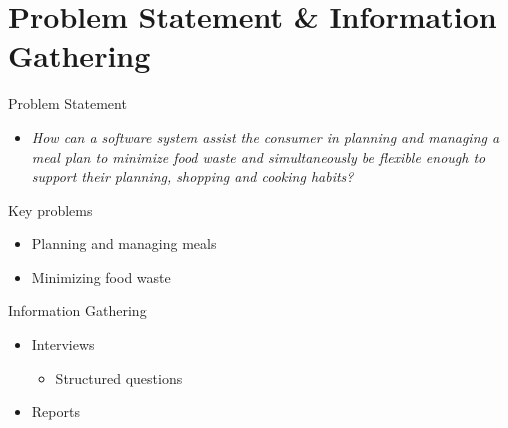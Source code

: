 \section{Problem Statement \& Information Gathering} 
\begin{frame}{Problem Statement}
    \begin{itemize}
        \item \textit{How can a software system assist the consumer in planning and managing a meal plan
        to minimize food waste and simultaneously be flexible enough to support their planning,
        shopping and cooking habits?}
    \end{itemize}
    	Key problems
        \begin{itemize}
            \item Planning and managing meals
            \item Minimizing food waste
        \end{itemize}
\end{frame}

\begin{frame}{Information Gathering}
    \begin{itemize}
        \item Interviews
        \begin{itemize}
        	\item Structured questions
        \end{itemize}
        \item Reports
    \end{itemize}
\end{frame}

